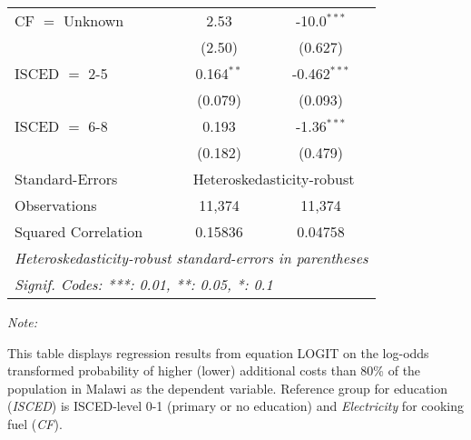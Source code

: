 \begin{table}[htbp!]
\begin{adjustbox}{width = 1\textwidth, max height = 0.95\textheight, center}
\begin{threeparttable}[b]
\begin{tabular}{lcc}
            CF $=$ Unknown       & 2.53           & -10.0$^{***}$\\   
                                 & (2.50)         & (0.627)\\   
            ISCED $=$ 2-5        & 0.164$^{**}$   & -0.462$^{***}$\\   
                                 & (0.079)        & (0.093)\\   
            ISCED $=$ 6-8        & 0.193          & -1.36$^{***}$\\   
                                 & (0.182)        & (0.479)\\   
            \midrule 
            Standard-Errors & \multicolumn{2}{c}{Heteroskedasticity-robust} \\ 
            Observations         & 11,374         & 11,374\\  
            Squared Correlation  & 0.15836        & 0.04758\\  
            \midrule \midrule
            \multicolumn{3}{l}{\emph{Heteroskedasticity-robust standard-errors in parentheses}}\\
            \multicolumn{3}{l}{\emph{Signif. Codes: ***: 0.01, **: 0.05, *: 0.1}}\\
         \end{tabular}
         
         \begin{tablenotes}\item \medskip \textit{Note:}
            \item This table displays regression results from equation LOGIT on the log-odds transformed probability of higher (lower) additional costs than 80\% of the population in Malawi as the dependent variable. Reference group for education (\textit{ISCED}) is ISCED-level 0-1 (primary or no education) and \textit{Electricity} for cooking fuel (\textit{CF}).
         \end{tablenotes}
      \end{threeparttable}
   \end{adjustbox}
\end{table}


